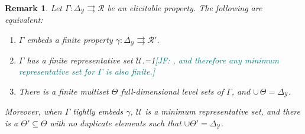 \documentclass[12pt]{article}
\newcommand{\Comments}{1}
\newcommand{\mynote}[2]{\ifnum\Comments=1\textcolor{#1}{#2}\fi}
\newcommand{\jessie}[1]{\mynote{teal}{[JF: #1]}}
\newcommand{\simplex}{\Delta_\Y}
\newcommand{\R}{\mathcal{R}}
\newcommand{\U}{\mathcal{U}}
\newcommand{\Y}{\mathcal{Y}}
\newcommand{\toto}{\rightrightarrows}
\newtheorem{remark}{Remark}
\begin{document}
\begin{remark}\label{remark:embed-trim}
  Let $\Gamma:\simplex\toto \R$ be an elicitable property.
  The following are equivalent:
  \begin{enumerate}\setlength{\itemsep}{0pt}
  \item $\Gamma$ embeds a finite property $\gamma:\simplex \toto \R'$.
  \item $\Gamma$ has a finite representative set $\U$.\jessie{, and therefore any minimum representative set for $\Gamma$ is also finite.}
  \item There is a finite multiset $\Theta$ full-dimensional level sets of $\Gamma$, and $\cup\, \Theta = \simplex$. 
  \end{enumerate}
  Moreover, when $\Gamma$ tightly embeds $\gamma$, $\U$ is a minimum representative set, and there is a $\Theta' \subseteq \Theta$ with no duplicate elements such that $\cup \Theta' = \simplex$.
\end{remark}
\end{document}

